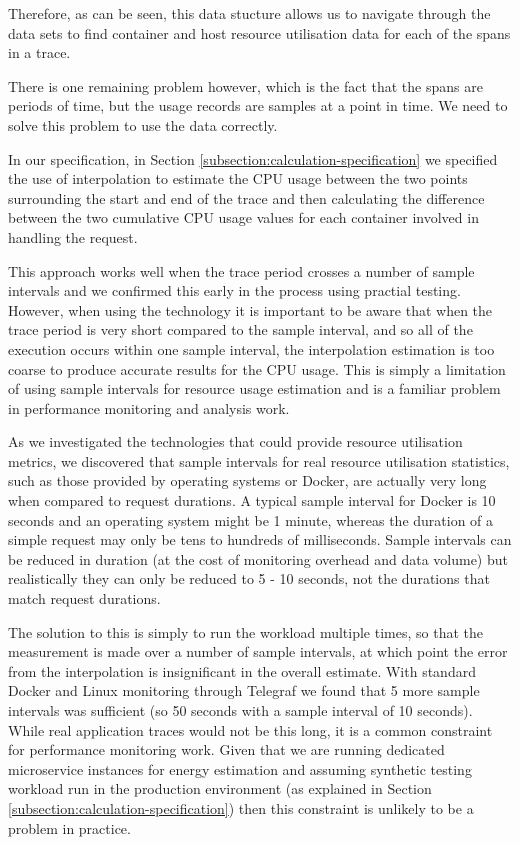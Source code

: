 Therefore, as can be seen, this data stucture allows us to navigate through the data sets to find container and host resource utilisation data for each of the spans in a trace.

There is one remaining problem however, which is the fact that the spans are periods of time, but the usage records are samples at a point in time.  We need to solve this problem to use the data correctly.

In our specification, in Section \ref{subsection:calculation-specification} we specified the use of interpolation to estimate the CPU usage between the two points surrounding the start and end of the trace and then calculating the difference between the two cumulative CPU usage values for each container involved in handling the request.  

This approach works well when the trace period crosses a number of sample intervals and we confirmed this early in the process using practial testing.  However, when using the technology it is important to be aware that when the trace period is very short compared to the sample interval, and so all of the execution occurs within one sample interval, the interpolation estimation is too coarse to produce accurate results for the CPU usage.  This is simply a limitation of using sample intervals for resource usage estimation and is a familiar problem in performance monitoring and analysis work.

As we investigated the technologies that could provide resource utilisation metrics, we discovered that sample intervals for real resource utilisation statistics, such as those provided by operating systems or Docker, are actually very long when compared to request durations.  A typical sample interval for Docker is 10 seconds and an operating system might be 1 minute, whereas the duration of a simple request may only be tens to hundreds of milliseconds.  Sample intervals can be reduced in duration (at the cost of monitoring overhead and data volume) but realistically they can only be reduced to 5 - 10 seconds, not the durations that match request durations.

The solution to this is simply to run the workload multiple times, so that the measurement is made over a number of sample intervals, at which point the error from the interpolation is insignificant in the overall estimate.  With standard Docker and Linux monitoring through Telegraf we found that 5 more sample intervals was sufficient (so 50 seconds with a sample interval of 10 seconds).  While real application traces would not be this long, it is a common constraint for performance monitoring work.  Given that we are running dedicated microservice instances for energy estimation and assuming synthetic testing workload run in the production environment (as explained in Section \ref{subsection:calculation-specification}) then this constraint is unlikely to be a problem in practice.


